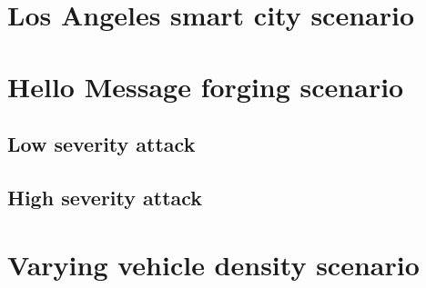 	\section{Los Angeles smart city scenario}
	
	\section{Hello Message forging scenario}
		\subsection{Low severity attack}
		\subsection{High severity attack}
	
	\section{Varying vehicle density scenario}

	
	
	

	